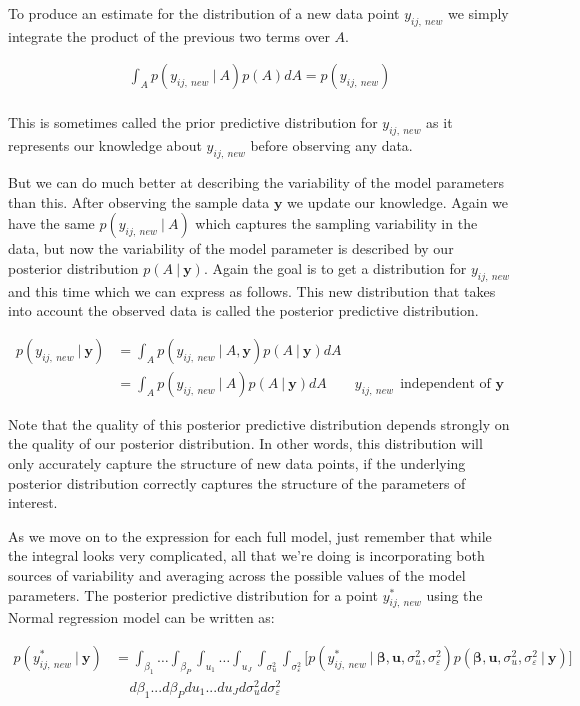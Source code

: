 \documentclass[12pt,twoside]{reedthesis}
\begin{document}
To produce an estimate for the distribution of a new data point \(y_{ij, \ new}\) we simply integrate the product of the previous two terms over \(A\).

\[
\begin{aligned}
\int_A p(y_{ij, \ new} \ | \ A)p(A )dA   = p(y_{ij, \ new} )   \\
\end{aligned}
\]

This is sometimes called the prior predictive distribution for \(y_{ij, \ new}\) as it represents our knowledge about \(y_{ij, \ new}\) before observing any data.

But we can do much better at describing the variability of the model parameters than this. After observing the sample data \(\mathbf{y}\) we update our knowledge. Again we have the same \(p(y_{ij, \ new} \ | \ A)\) which captures the sampling variability in the data, but now the variability of the model parameter is described by our posterior distribution \(p(A \ | \ \mathbf{y})\). Again the goal is to get a distribution for \(y_{ij, \ new}\) and this time which we can express as follows. This new distribution that takes into account the observed data is called the posterior predictive distribution.

\[
\begin{aligned}
p(y_{ij,\ new} \ | \ \mathbf{y}) &= 
\int_A p(y_{ij, \ new} \ | \ A, \mathbf{y})p(A \ | \ \mathbf{y})dA \\ &=  \int_A p(y_{ij, \ new} \ | \ A)p(A \ | \ \mathbf{y})dA \qquad y_{ij, \ new} \ \  \text{independent of } \mathbf{y} 
\end{aligned}
\]

Note that the quality of this posterior predictive distribution depends strongly on the quality of our posterior distribution. In other words, this distribution will only accurately capture the structure of new data points, if the underlying posterior distribution correctly captures the structure of the parameters of interest.

As we move on to the expression for each full model, just remember that while the integral looks very complicated, all that we're doing is incorporating both sources of variability and averaging across the possible values of the model parameters. The posterior predictive distribution for a point \(y^*_{ij, \ new}\) using the Normal regression model can be written as:

\[
\begin{aligned}
p(y^*_{ij, \ new} \ | \ \mathbf{y}) &=  \int_{\beta_1}  \dots \int_{\beta_P} \int_{u_1} \dots \int_{u_J} \int_{\sigma_{u}^2} \int_{\sigma_{\varepsilon}^2} \bigg[p(y^*_{ij, \ new} \ | \ \boldsymbol{\beta}, \boldsymbol{u}, \sigma_{u}^2, \sigma_{\varepsilon}^2)p(\boldsymbol{\beta}, \mathbf{u}, \sigma_{u}^2, \sigma_{\varepsilon}^2 \ | \ \mathbf{y})\bigg] \\
& \ \ \ \ \ d\beta_1 ...  d\beta_Pdu_1...du_Jd\sigma_{u}^2d\sigma_{\varepsilon}^2
\end{aligned}
\]
\end{document}
